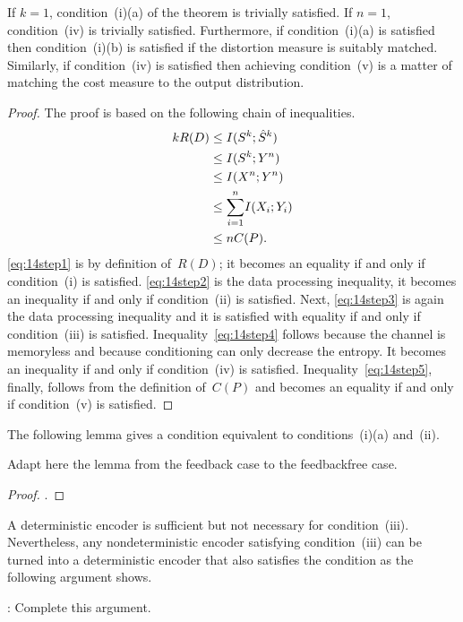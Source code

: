 \begin{discussion}
  If $k = 1$, condition~(i)(a) of the theorem is trivially satisfied. If $n =
  1$, condition~(iv) is trivially satisfied. Furthermore, if condition~(i)(a) is
  satisfied then condition~(i)(b) is satisfied if the distortion measure is
  suitably matched. Similarly, if condition~(iv) is satisfied then achieving
  condition~(v) is a matter of matching the cost measure to the output
  distribution. 
\end{discussion}

\begin{proof}
  The proof is based on the following chain of inequalities.
  \begin{align}
    \label{eq:14step1}
    k R(D) &\le I(S^k; {\hat{S}}^k) \\
    \label{eq:14step2}
    &\le I(S^k; Y^n) \\
    \label{eq:14step3}
    &\le I(X^n; Y^n) \\
    \label{eq:14step4}
    &\le {\sum_{i=1}^n} I(X_i; Y_i)  \\
    \label{eq:14step5}
    &\le n C(P).
  \end{align}
  \eqref{eq:14step1} is by definition of~$R(D)$; it becomes an equality if and
  only if condition~(i) is satisfied. \eqref{eq:14step2} is the data processing
  inequality, it becomes an inequality if and only if condition~(ii) is
  satisfied. Next, \eqref{eq:14step3} is again the data processing inequality
  and it is satisfied with equality if and only if condition~(iii) is satisfied.
  Inequality~\eqref{eq:14step4} follows because the channel is memoryless and
  because conditioning can only decrease the entropy. It becomes an inequality
  if and only if condition~(iv) is satisfied. Inequality~\eqref{eq:14step5},
  finally, follows from the definition of~$C(P)$ and becomes an equality if and
  only if condition~(v) is satisfied.
\end{proof}

The following lemma gives a condition equivalent to conditions~(i)(a) and~(ii).
\begin{lemma}
  \label{lem:ssil}
  Adapt here the lemma from the feedback case to the feedbackfree case.
\end{lemma}
\begin{proof}
  \todo.
\end{proof}

\begin{remark}
  \label{rem:inflosslessenc}
  A deterministic encoder is sufficient but not necessary for condition~(iii).
  Nevertheless, any nondeterministic encoder satisfying condition~(iii) can be
  turned into a deterministic encoder that also satisfies the condition as the
  following argument shows. 

  \todo: Complete this argument.
\end{remark}

